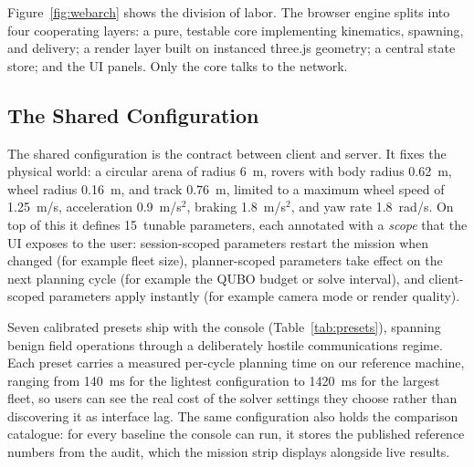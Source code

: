 Figure~\ref{fig:webarch} shows the division of labor. The browser engine
splits into four cooperating layers: a pure, testable core implementing
kinematics, spawning, and delivery; a render layer built on instanced
three.js geometry; a central state store; and the UI panels. Only the core
talks to the network.

\subsection{The Shared Configuration}

The shared configuration is the contract between client and server. It
fixes the physical world: a circular arena of radius 6~m, rovers with body
radius 0.62~m, wheel radius 0.16~m, and track 0.76~m, limited to a maximum
wheel speed of 1.25~m/s, acceleration 0.9~m/s$^2$, braking 1.8~m/s$^2$,
and yaw rate 1.8~rad/s. On top of this it defines 15~tunable parameters,
each annotated with a \emph{scope} that the UI exposes to the user:
session-scoped parameters restart the mission when changed (for example
fleet size), planner-scoped parameters take effect on the next planning
cycle (for example the QUBO budget or solve interval), and client-scoped
parameters apply instantly (for example camera mode or render quality).

Seven calibrated presets ship with the console
(Table~\ref{tab:presets}), spanning benign field operations through a
deliberately hostile communications regime. Each preset carries a measured
per-cycle planning time on our reference machine, ranging from 140~ms for
the lightest configuration to 1420~ms for the largest fleet, so users can
see the real cost of the solver settings they choose rather than
discovering it as interface lag. The same configuration also holds the
comparison catalogue: for every baseline the console can run, it stores
the published reference numbers from the audit, which the mission strip
displays alongside live results.

